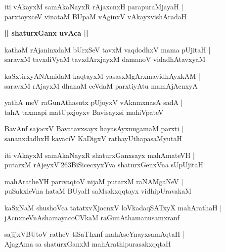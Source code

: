 \documentclass[twoside,12pt,openright]{book}
\def\S{\char'263}
\newcounter{shloka}[chapter]
\def\uvaca#1{\centerline{{\large\textbf{#1}}}}
\begin{document}
\begin{shloka}%
iti vAkayxM samAkaNayxR rAjaxcnxH parapuraMjayaH |\\
parxtoyxceV vinataM BUpaM vAginxV vAkayxvishAradaH 
\end{shloka}

\uvaca{|| shaturxGanx uvAca ||}

\begin{shloka}%
kathaM rAjaninxdaM bUrxSeV tavxM vaqdodhxV mama pUjitaH |\\
saravxM tavxdiVyaM tavxdArxjayxM damanoV vidadhAtavxyaM 
\end{shloka}

\begin{shloka}%
kaSxtirxyANAmidaM kaqtayxM yasasxMgArxmavidhAyxkAM |\\
saravxM rAjayxM dhanaM ceVdaM parxtiyAtu mamAjAcnxyA 
\end{shloka}

\begin{shloka}%
yathA meV raGunAthasutx pUjoyxV vAknmxnasA sadA |\\
tahA taxmapi matUpxjoyxv Bavisayxsi mahiVpateV 
\end{shloka}

\begin{shloka}%
BavAnf sajocxV Bavatavxsayx hayasAyxnugamaM parxti |\\
sananxdadhxH kavaciV KaDigxV rathayUthapasaMyutaH 
\end{shloka}

\begin{shloka}%
iti vAkayxM samAkaNayxR shaturxGanxsayx mahAmateVH |\\
putarxM rAjeyxV\S BiSicecxyxYva shaturxGenxVna sUpUjitaH 
\end{shloka}

\begin{shloka}%
mahAratheYH parivaqtoV nijaM putarxM raNAMgaNeV |\\
puSakxleVna hataM BUyaH saMsakxqqtayx vidhipUravakaM 
\end{shloka}

\begin{shloka}%
kaSxNaM shushoVca tatatxvXjocnxV loVkadaqSATxyX mahArathaH |\\
jAcnxneVnAshamayacoCVkaM raGunAthamanusamxranf 
\end{shloka}

\begin{shloka}%
sajijxVBUtoV ratheV tiSaThxnf mahAseYnayxsamAqtaH |\\
AjagAma sa shaturxGanxM mahArathipurasakxqqtaH 
\end{shloka}
\end{document}
